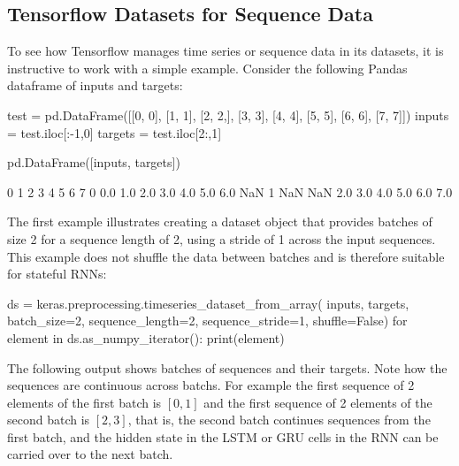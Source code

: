 \subsection*{Tensorflow Datasets for Sequence Data}

To see how Tensorflow manages time series or sequence data in its datasets, it is instructive to work with a simple example. Consider the following Pandas dataframe of inputs and targets:

\begin{samepage}
\begin{pythoncode}
test = pd.DataFrame([[0, 0], [1, 1], [2, 2,], [3, 3], 
                     [4, 4], [5, 5], [6, 6], [7, 7]]) 
inputs = test.iloc[:-1,0]
targets = test.iloc[2:,1]

pd.DataFrame([inputs, targets])
\end{pythoncode}
\end{samepage}

\begin{samepage}
\begin{textcode}
     0    1    2    3    4    5    6    7
0  0.0  1.0  2.0  3.0  4.0  5.0  6.0  NaN
1  NaN  NaN  2.0  3.0  4.0  5.0  6.0  7.0
\end{textcode}
\end{samepage}

The first example illustrates creating a dataset object that provides batches of size 2 for a sequence length of 2, using a stride of 1 across the input sequences. This example does not shuffle the data between batches and is therefore suitable for stateful RNNs:

\begin{samepage}
\begin{pythoncode}
ds = keras.preprocessing.timeseries_dataset_from_array(
     inputs, targets,
     batch_size=2, sequence_length=2, sequence_stride=1, shuffle=False)
for element in ds.as_numpy_iterator():
     print(element)
\end{pythoncode}
\end{samepage}

The following output shows batches of sequences and their targets. Note how the sequences are continuous across batchs. For example the first sequence of 2 elements of the first batch is $[0, 1]$ and the first sequence of 2 elements of the second batch is $[2, 3]$, that is, the second batch continues sequences from the first batch, and the hidden state in the LSTM or GRU cells in the RNN can be carried over to the next batch. 
 
